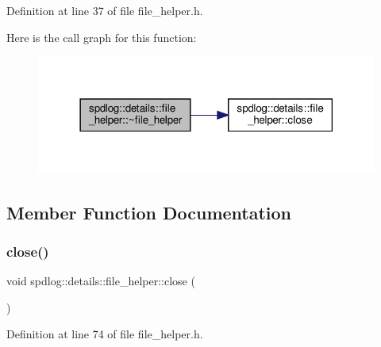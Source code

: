 Definition at line 37 of file file\+\_\+helper.\+h.

Here is the call graph for this function\+:
\nopagebreak
\begin{figure}[H]
\begin{center}
\leavevmode
\includegraphics[width=318pt]{classspdlog_1_1details_1_1file__helper_aad84ef5f999c2721a0a8ad36ce641e8c_cgraph}
\end{center}
\end{figure}


\subsection{Member Function Documentation}
\mbox{\label{classspdlog_1_1details_1_1file__helper_a6a6d7a75014ae880857b4fe4fd01dc7a}} 
\subsubsection{\texorpdfstring{close()}{close()}}
{\footnotesize\ttfamily void spdlog\+::details\+::file\+\_\+helper\+::close (\begin{DoxyParamCaption}{ }\end{DoxyParamCaption})\hspace{0.3cm}{\ttfamily [inline]}}



Definition at line 74 of file file\+\_\+helper.\+h.

